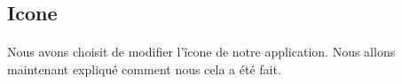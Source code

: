 \documentclass[a4paper]{article}
\begin{document}
\begin{multicols}{2}
        \section{Icone}
            \paragraph{}
                Nous avons choisit de modifier l'îcone de notre application. Nous allons maintenant expliqué comment nous cela a été fait.
    \end{multicols}
\end{document}
